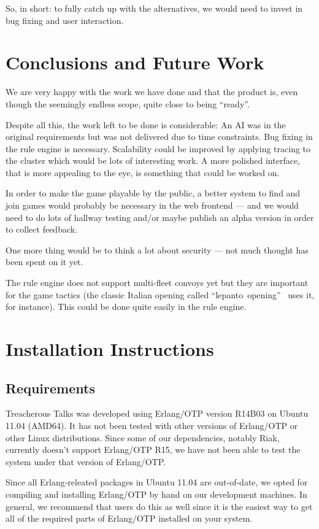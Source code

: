 \documentclass[11pt,a4paper]{report}
\begin{document}
So, in short: to fully catch up with the alternatives, we would need to invest
in bug fixing and user interaction.

\chapter{Conclusions and Future Work}
We are very happy with the work we have done and that the product is, even
though the seemingly endless scope, quite close to being ``ready''.

Despite all this, the work left to be done is considerable:
An AI was in the original requirements but was not delivered due to time
constraints.
Bug fixing in the rule engine is necessary. Scalability could be improved by
applying tracing to the cluster which would be lots of interesting work. A more
polished interface, that is more appealing to the eye, is something that could
be worked on.

In order to make the game playable by the public, a better system to find and
join games would probably be necessary in the web frontend --- and we would
need to do lots of hallway testing and/or maybe publish an alpha version in
order to collect feedback.

One more thing would be to think a lot about security --- not much thought has
been spent on it yet.

The rule engine does not support multi-fleet convoys yet but they are important
for the game tactics (the classic Italian opening called
``lepanto~opening''~\cite{lepanto} uses it, for instance).
This could be done quite easily in the rule engine.

\appendix
\chapter{Installation Instructions}
\section{Requirements}
Treacherous Talks was developed using Erlang/OTP version R14B03 on Ubuntu 11.04
(AMD64). It has not been tested with other versions of Erlang/OTP or other Linux
distributions. Since some of our dependencies, notably Riak, currently doesn't
support Erlang/OTP R15, we have not been able to test the system under that
version of Erlang/OTP.

Since all Erlang-releated packages in Ubuntu 11.04 are out-of-date, we opted for
compiling and installing Erlang/OTP by hand on our development machines. In
general, we recommend that users do this as well since it is the easiest way to
get all of the required parts of Erlang/OTP installed on your system.
\end{document}
